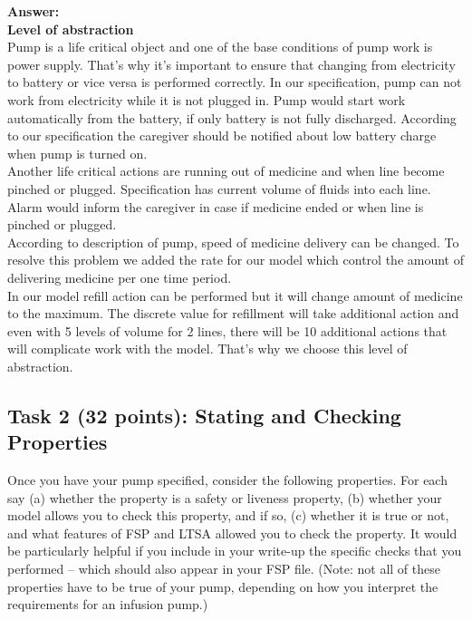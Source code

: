\documentclass{article}
\newcommand{\head}{\subsection*}
\begin{document}
\textbf{Answer:}\\
\textbf{Level of abstraction}\\

Pump is a life critical object and one of the base conditions of pump work is power supply. That's why it's important to ensure that changing from electricity to battery or vice versa is performed correctly. In our specification, pump can not work from electricity while it is not plugged in. Pump would start work automatically from the battery, if only battery is not fully discharged. According to our specification the caregiver should be notified about low battery charge when pump is turned on. \\
Another life critical actions are running out of medicine and when line become pinched or plugged. Specification has current volume of fluids into each line. Alarm would inform the caregiver in case if medicine ended or when line is pinched or plugged.  \\
According to description of pump, speed of medicine delivery can be changed. To resolve this problem we added the rate for our model which control the amount of delivering medicine per one time period. \\
In our model refill action can be performed but it will change amount of medicine to the maximum. The discrete value for refillment will take additional action and even with 5 levels of volume for 2 lines, there will be 10 additional actions that will complicate work with the model. That's why we choose this level of abstraction. \\

\head{Task 2 (32 points): Stating and Checking Properties}

Once you have your pump specified, consider the following properties. For each say (a) whether the property
is a safety or liveness property,  (b) whether your model allows you to check this property, and if
so, (c) whether it is true or not, and what features of FSP and LTSA allowed you to check the
property. It would be particularly helpful if you include in your write-up the specific checks that you performed -- which should also appear in your FSP file. (Note: not all of these properties have to be true of your pump, depending on how you interpret the requirements for an infusion pump.)
\end{document}
